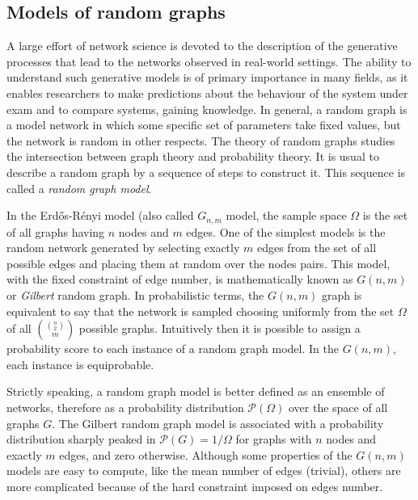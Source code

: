 \documentclass[11pt,              a4paper,              twoside,openright,              titlepage,              headinclude,footinclude,                            numbers=noenddot,              cleardoublepage=empty,]{scrreprt}
\begin{document}
\subsection{Models of random graphs}\label{sec:models_random_graph}
A large effort of network science is devoted to the description of the generative processes that lead to the networks observed in real-world settings.
The ability to understand such generative models is of primary importance in many fields, as it enables researchers to make predictions about the behaviour of the system under exam and to compare systems, gaining knowledge.
In general, a random graph is a model network in which some specific set of parameters take fixed values, but the network is random in other respects.
The theory of random graphs studies the intersection between graph theory and probability theory.
It is usual to describe a random graph by a sequence of steps to construct it. This sequence is called a \emph{random graph model}.

In the Erd\H{o}s-Rényi model (also called $G_{n,m}$ model, the sample space $\Omega$ is the set of all graphs having $n$ nodes and $m$ edges.
One of the simplest models is the random network generated by selecting exactly $m$ edges from the set of all possible edges and placing them at random over the nodes pairs.
This model, with the fixed constraint of edge number, is mathematically known as $G(n,m)$ or \emph{Gilbert} random graph.
In probabilistic terms, the $G(n,m)$ graph is equivalent to say that the network is sampled choosing uniformly from the set $\Omega$ of all $\binom{\binom{n}{2}}{m}$ possible graphs.
Intuitively then it is possible to assign a probability score to each instance of a random graph model.
In the $G(n,m)$, each instance is equiprobable.

Strictly speaking, a random graph model is better defined as an ensemble of networks, therefore as a probability distribution $\mathcal{P}(\Omega)$ over the space of all graphs $G$.
The Gilbert random graph model is associated with a probability distribution sharply peaked in $\mathcal{P}(G)=1/\Omega$ for graphs with $n$ nodes and exactly $m$ edges, and zero otherwise.
Although some properties of the $G(n,m)$ models are easy to compute, like the mean number of edges (trivial), others are more complicated because of the hard constraint imposed on edges number.
\end{document}
